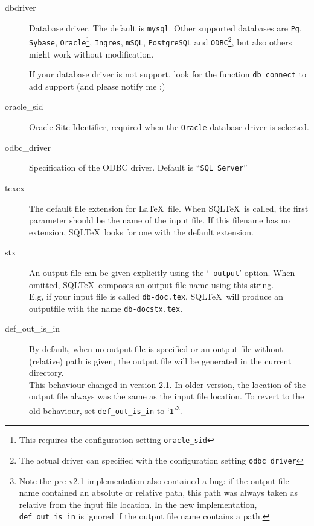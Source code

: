 \documentclass{article}
\newcommand{\vs}{\vspace{3mm}}
\begin{document}
\begin{description}

\item[dbdriver] Database driver. The default is \texttt{mysql}.
Other supported databases are \texttt{Pg}, \texttt{Sybase}, \texttt{Oracle}\footnote{ This requires the configuration setting \texttt{oracle\_sid}}, \texttt{Ingres}, \texttt{mSQL}, \texttt{PostgreSQL} and \texttt{ODBC}\footnote{ The actual driver can specified with the configuration setting \texttt{odbc\_driver}}, but also others might work without modification. \\

\vs

If your database driver is not support, look for the function
\texttt{db\_connect} to add support (and please notify me :) 

\item[oracle\_sid] Oracle Site Identifier, required when the \texttt{Oracle} database driver is selected.

\item[odbc\_driver] Specification of the ODBC driver. Default is ``\texttt{SQL Server}''
 

\item[texex] The default file extension for \LaTeX\ file. When SQL\TeX\ is called, the first
parameter should be the name of the input file. If this filename has no extension,
SQL\TeX\ looks for one with the default extension.

\item[stx] An output file can be given explicitly using the `\texttt{--output}' option. When omitted,
SQL\TeX\ composes an output file name using this string.\\
E.g, if your input file is called \texttt{db-doc.tex}, SQL\TeX\ will produce an
outputfile with the name \texttt{db-docstx.tex}.

\item[def\_out\_is\_in] By default, when no output file is specified or an output file without (relative) path is given, the output file will be generated in the current directory.\\
This behaviour changed in version 2.1. In older version, the location of the output file always was the same as the input file location. To revert to the old behaviour, set \texttt{def\_out\_is\_in} to `\texttt{1}'\footnote{ Note the pre-v2.1 implementation also contained a bug: if the output file name contained an absolute or relative path, this path was always taken as relative from the input file location. In the new implementation, \texttt{def\_out\_is\_in} is ignored if the output file name contains a path.}.


\end{description}
\end{document}
